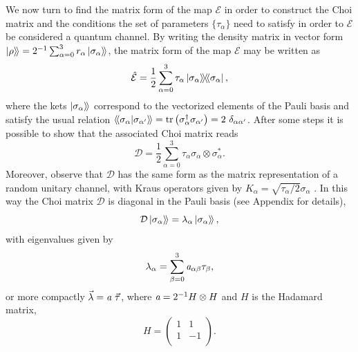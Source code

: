 We now turn to find the matrix form of the map $\mathcal{E}$ in order to construct the Choi matrix and the conditions the set of parameters $\{\tau_{\alpha}\}$ need to satisfy in order to $\mathcal{E}$ be considered a quantum channel. By writing the density matrix in vector form $\mathinner{|{\rho}\rangle \! \rangle}=2^{-1}\sum_{\alpha=0}^{3} r_{\alpha} \mathinner{|{\sigma_{\alpha}}\rangle \! \rangle}$, the matrix form of the map $\mathcal{E}$ may be written as
% 
\begin{equation}
\hat{\mathcal{E}} = \frac{1}{2}\sum_{\alpha=0}^{3} \tau_{\alpha} \mathinner{|{\sigma_{\alpha}}\rangle\!\rangle\!\langle\!\langle{\sigma_{\alpha}}|},
\end{equation}
%
where the kets $\mathinner{|{\sigma_{\alpha}}\rangle \! \rangle}$ correspond to the vectorized elements of the Pauli basis and satisfy the usual relation $ \mathinner{\langle\!\langle {{\sigma_{\alpha} }}|{{\sigma_{\alpha'} }}\rangle\!\rangle} = \tr \left(\sigma_{\alpha}^{\dagger} \sigma_{\alpha'}\right) = 2 ~\delta_{\alpha\alpha'}$. After some steps it is possible to show that the associated Choi matrix reads
% 
\begin{equation}
 \mathcal{D} = \frac{1}{2}\sum_{\alpha=0}^{3} \tau_{\alpha} \sigma_{\alpha} \otimes \sigma_{\alpha}^*.
\end{equation}
% 
Moreover, observe that $\mathcal{D}$ has the same form as the matrix representation of a random unitary channel, with Kraus operators given by $K_{\alpha}=\sqrt{\tau_{\alpha}/2}\sigma_{\alpha}$ \cite{CHRUSCINSKI20131425}. In this way the Choi matrix $\mathcal{D}$ is diagonal in the Pauli basis (see Appendix for details),
%
\begin{equation}
 \mathcal{D} \mathinner{|{\sigma_{\alpha}}\rangle \! \rangle}= \lambda_{\alpha} \mathinner{|{\sigma_{\alpha}}\rangle \! \rangle},
\end{equation}
% 
with eigenvalues given by 
% 
\begin{equation}
 \lambda_{\alpha} = \sum_{\beta=0}^3\textit{a}_{\alpha\beta}\tau_{\beta},
\end{equation}
%
or more compactly $\vec{\lambda} = \textit{a}~\vec{\tau}$, where $\textit{a}=2^{-1}H\otimes H$ and $H$ is the Hadamard matrix,
%
\begin{equation}
 H=\begin{pmatrix}
        1 & 1\\
        1 & -1\\
    \end{pmatrix}.
 \label{Hadd_Mat}
\end{equation}
% 
